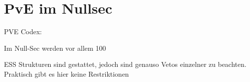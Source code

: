 \section{PvE im Nullsec}
PVE Codex:

Im Null-Sec werden vor allem 100%

ESS Strukturen sind gestattet, jedoch sind genauso Vetos einzelner zu beachten. Praktisch gibt es hier keine Restriktionen
